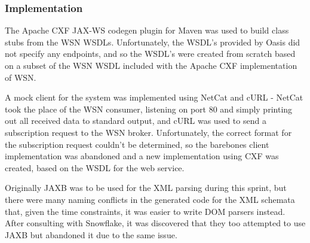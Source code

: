 \documentclass[a4paper, 12pt, twoside]{article}
\begin{document}

\subsubsection{Implementation}

The Apache CXF JAX-WS codegen plugin for Maven was used to build class stubs from the WSN WSDLs. Unfortunately, the WSDL's provided by Oasis did not specify any endpoints, and so the WSDL's were created from scratch based on a subset of the WSN WSDL included with the Apache CXF implementation of WSN.

A mock client for the system was implemented using NetCat and cURL - NetCat took the place of the WSN consumer, listening on port 80 and simply printing out all received data to standard output, and cURL was used to send a subscription request to the WSN broker. Unfortunately, the correct format for the subscription request couldn't be determined, so the barebones client implementation was abandoned and a new implementation using CXF was created, based on the WSDL for the web service.

Originally JAXB was to be used for the XML parsing during this sprint, but there were many naming conflicts in the generated code for the XML schemata that, given the time constraints, it was easier to write DOM parsers instead. After consulting with Snowflake, it was discovered that they too attempted to use JAXB but abandoned it due to the same issue.
\end{document}
